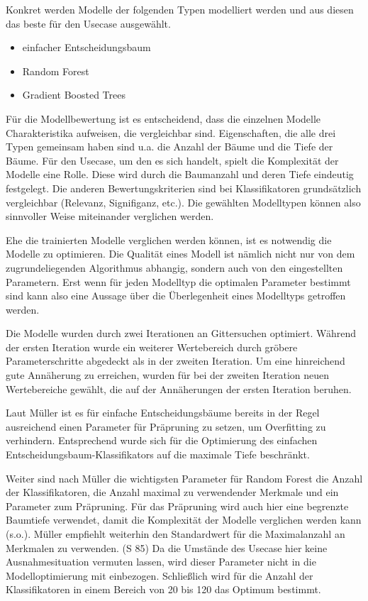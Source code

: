 Konkret werden Modelle der folgenden Typen modelliert werden und aus diesen das beste für den Usecase ausgewählt.
\begin{itemize}
    \item einfacher Entscheidungsbaum
    \item Random Forest
    \item Gradient Boosted Trees
\end{itemize}

Für die Modellbewertung ist es entscheidend, dass die einzelnen Modelle Charakteristika aufweisen, die vergleichbar sind. Eigenschaften, die alle drei Typen gemeinsam haben sind u.a. die Anzahl der Bäume und die Tiefe der Bäume. Für den Usecase, um den es sich handelt, spielt die Komplexität der Modelle eine Rolle. Diese wird durch die Baumanzahl und deren Tiefe eindeutig festgelegt. Die anderen Bewertungskriterien sind bei Klassifikatoren grundsätzlich vergleichbar (Relevanz, Signifiganz, etc.).
Die gewählten Modelltypen können also sinnvoller Weise miteinander verglichen werden. 

Ehe die trainierten Modelle verglichen werden können, ist es notwendig die Modelle zu optimieren. Die Qualität eines Modell ist nämlich nicht nur von dem zugrundeliegenden Algorithmus abhangig, sondern auch von den eingestellten Parametern. Erst wenn für jeden Modelltyp die optimalen Parameter bestimmt sind kann also eine Aussage über die Überlegenheit eines Modelltyps getroffen werden.

Die Modelle wurden durch zwei Iterationen an Gittersuchen optimiert. Während der ersten Iteration wurde ein weiterer Wertebereich durch gröbere Parameterschritte abgedeckt als in der zweiten Iteration. Um eine hinreichend gute Annäherung zu erreichen, wurden für bei der zweiten Iteration neuen Wertebereiche gewählt, die auf der Annäherungen der ersten Iteration beruhen.



Laut Müller  ist es für einfache Entscheidungsbäume bereits in der Regel ausreichend einen Parameter für Präpruning zu setzen, um Overfitting zu verhindern. Entsprechend wurde sich für die Optimierung des einfachen Entscheidungsbaum-Klassifikators auf die maximale Tiefe beschränkt. 

Weiter sind nach Müller die wichtigsten Parameter für Random Forest die Anzahl der Klassifikatoren, die Anzahl maximal zu verwendender Merkmale und ein Parameter zum Präpruning. Für das Präpruning wird auch hier eine begrenzte Baumtiefe verwendet, damit die Komplexität der Modelle verglichen werden kann (s.o.). 
Müller empfiehlt weiterhin den Standardwert für die Maximalanzahl an Merkmalen zu verwenden. (S 85) Da die Umstände des Usecase hier keine Ausnahmesituation vermuten lassen, wird dieser Parameter nicht in die Modelloptimierung mit einbezogen.
Schließlich wird für die Anzahl der Klassifikatoren in einem Bereich von 20 bis 120 das Optimum bestimmt.


